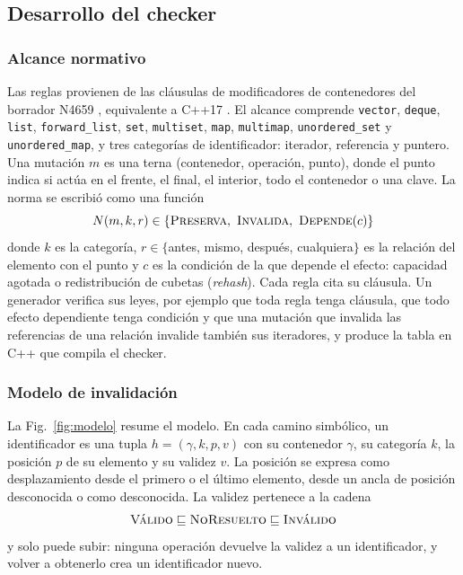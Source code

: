 \documentclass[conference]{IEEEtran}
\newcommand{\code}[1]{\texttt{#1}}
\begin{document}
\subsection{Desarrollo del checker}

\subsubsection{Alcance normativo}
Las reglas provienen de las cláusulas de modificadores de contenedores del borrador N4659 \cite{n4659}, equivalente a C++17 \cite{iso17}. El alcance comprende \code{vector}, \code{deque}, \code{list}, \code{forward\_list}, \code{set}, \code{multiset}, \code{map}, \code{multimap}, \code{unordered\_set} y \code{unordered\_map}, y tres categorías de identificador: iterador, referencia y puntero. Una mutación $m$ es una terna (contenedor, operación, punto), donde el punto indica si actúa en el frente, el final, el interior, todo el contenedor o una clave. La norma se escribió como una función
\begin{equation}
N(m,k,r) \in \{\textsc{Preserva},\ \textsc{Invalida},\ \textsc{Depende}(c)\}
\label{eq:norma}
\end{equation}
donde $k$ es la categoría, $r \in \{$antes, mismo, después, cualquiera$\}$ es la relación del elemento con el punto y $c$ es la condición de la que depende el efecto: capacidad agotada o redistribución de cubetas (\textit{rehash}). Cada regla cita su cláusula. Un generador verifica sus leyes, por ejemplo que toda regla tenga cláusula, que todo efecto dependiente tenga condición y que una mutación que invalida las referencias de una relación invalide también sus iteradores, y produce la tabla en C++ que compila el checker.

\subsubsection{Modelo de invalidación}
La Fig.~\ref{fig:modelo} resume el modelo. En cada camino simbólico, un identificador es una tupla $h=(\gamma,k,p,v)$ con su contenedor $\gamma$, su categoría $k$, la posición $p$ de su elemento y su validez $v$. La posición se expresa como desplazamiento desde el primero o el último elemento, desde un ancla de posición desconocida o como desconocida. La validez pertenece a la cadena
\begin{equation}
\textsc{Válido} \sqsubseteq \textsc{NoResuelto} \sqsubseteq \textsc{Inválido}
\label{eq:cadena}
\end{equation}
y solo puede subir: ninguna operación devuelve la validez a un identificador, y volver a obtenerlo crea un identificador nuevo.
\end{document}
